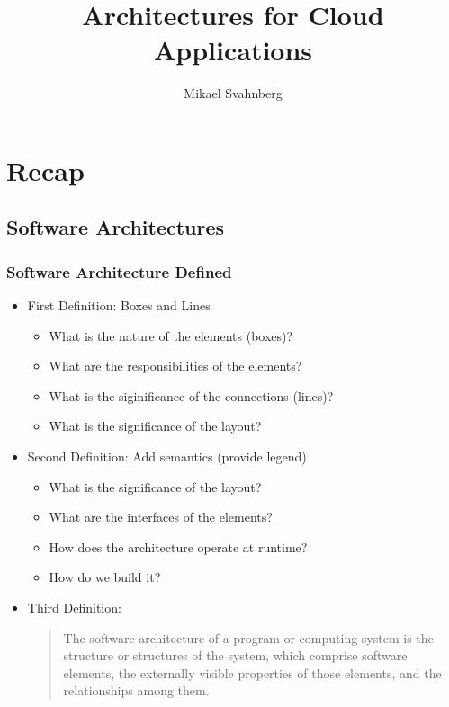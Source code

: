 \documentclass[10pt]{beamer}
\title[]{Architectures for Cloud Applications}
\subtitle{}
\author[Mikael Svahnberg]{Mikael Svahnberg\inst{1}}
\institute[BTH] %
{
  \inst{1}%
 Mikael.Svahnberg@bth.se\\
 School of Computing\\
 Blekinge Institute of Technology%
}
\begin{document}
\begin{frame}
  \titlepage
\end{frame}


\section{Recap}
\subsection{Software Architectures}

\begin{frame}[t]
\frametitle{Software Architecture Defined}

\begin{itemize}[<+->]
\item First Definition: Boxes and Lines
\begin{itemize}
\item What is the nature of the elements (boxes)?
\item What are the responsibilities of the elements?
\item What is the siginificance of the connections (lines)?
\item What is the significance of the layout?
\end{itemize}
\item Second Definition: Add semantics (provide legend)
\begin{itemize}
\item What is the significance of the layout?
\item What are the interfaces of the elements?
\item How does the architecture operate at runtime?
\item How do we build it?
\end{itemize}
\item Third Definition:\\
\begin{quote}
The software architecture of a program or computing system is the structure or structures of the system, which comprise software elements, the externally visible properties of those elements, and the relationships among them.
\end{quote}
\end{itemize}
\end{frame}
\end{document}
